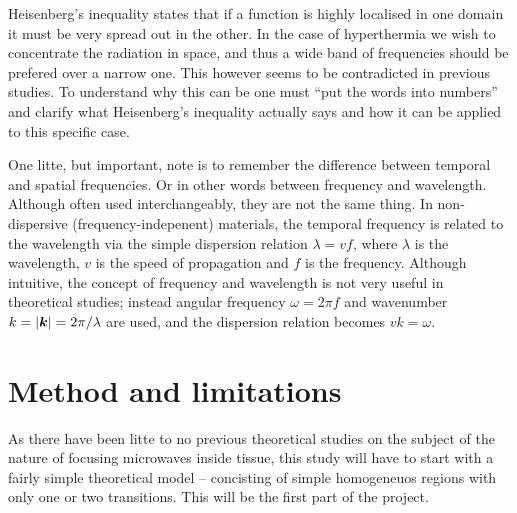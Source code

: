 \documentclass[11pt,a4paper, 
english, swedish %
]{article}
\newcommand{\std}{\ensuremath\text{std}}
\begin{document}
Heisenberg's inequality states that if a function is highly localised in one domain it must be very spread out in the other.
In the case of hyperthermia we wish to concentrate the radiation in space, and thus a wide band of frequencies should be prefered over a narrow one. This however seems to be contradicted in previous studies. 
To understand why this can be one must ``put the words into numbers'' and clarify what Heisenberg's inequality actually says and how it can be applied to this specific case. 

One litte, but important, note is to remember the difference between temporal and spatial frequencies. Or in other words between frequency and wavelength. Although often used interchangeably, they are not the same thing. 
In non-dispersive (frequency-indepenent) materials, the temporal frequency is related to the wavelength via the simple dispersion relation $\lambda=vf$, where $\lambda$ is the wavelength, $v$ is the speed of propagation and $f$ is the frequency. Although intuitive, the concept of frequency and wavelength is not very useful in theoretical studies; instead angular\footnotemark{} frequency $\omega=2\pi f$ and wavenumber $k=\abs{\vb*k}=2\pi/\lambda$ are used, and the dispersion relation becomes $vk=\omega$.







\section{Method and limitations}
As there have been litte to no previous theoretical studies on the subject of the nature of focusing microwaves inside tissue, this study will have to start with a fairly simple theoretical model -- concisting of simple homogeneuos regions with only one or two transitions. This will be the first part of the project.
\end{document}
